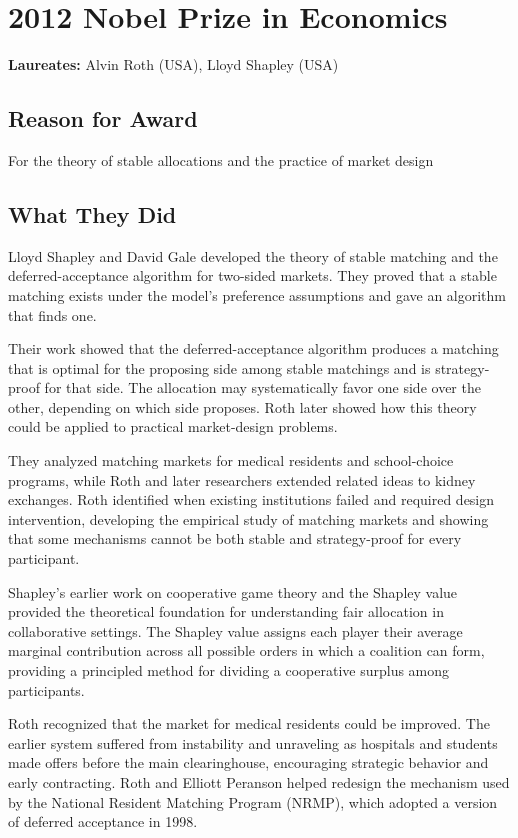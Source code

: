 \chapter{2012 Nobel Prize in Economics}
\textbf{Laureates: }Alvin Roth (USA), Lloyd Shapley (USA)

\section*{Reason for Award}
For the theory of stable allocations and the practice of market design

\section{What They Did}
Lloyd Shapley and David Gale developed the theory of stable matching and the
deferred-acceptance algorithm for two-sided markets. They proved that a stable
matching exists under the model's preference assumptions and gave an algorithm
that finds one.

Their work showed that the deferred-acceptance algorithm produces a matching
that is optimal for the proposing side among stable matchings and is strategy-
proof for that side. The allocation may systematically favor one side over the
other, depending on which side proposes. Roth later showed how this theory could
be applied to practical market-design problems.

They analyzed matching markets for medical residents and school-choice programs,
while Roth and later researchers extended related ideas to kidney exchanges.
Roth identified when existing institutions failed and required design
intervention, developing the empirical study of matching markets and showing
that some mechanisms cannot be both stable and strategy-proof for every
participant.

Shapley's earlier work on cooperative game theory and the Shapley value provided
the theoretical foundation for understanding fair allocation in collaborative
settings. The Shapley value assigns each player their average marginal
contribution across all possible orders in which a coalition can form, providing
a principled method for dividing a cooperative surplus among participants.

Roth recognized that the market for medical residents could be improved. The
earlier system suffered from instability and unraveling as hospitals and students
made offers before the main clearinghouse, encouraging strategic behavior and
early contracting. Roth and Elliott Peranson helped redesign the mechanism used
by the National Resident Matching Program (NRMP), which adopted a version of
deferred acceptance in 1998.

